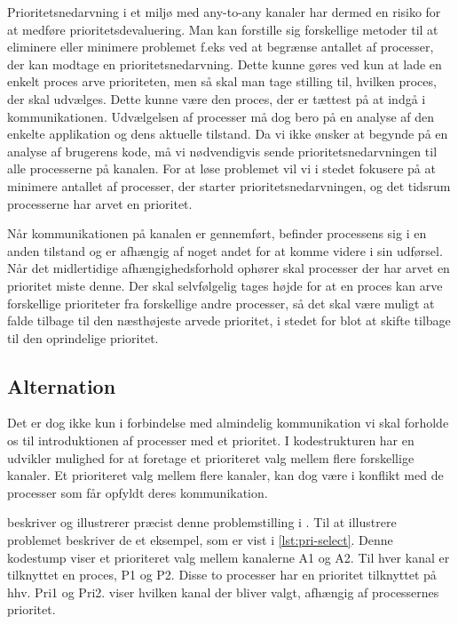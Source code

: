 Prioritetsnedarvning i et miljø med any-to-any kanaler har dermed en risiko for at medføre prioritetsdevaluering. Man kan forstille sig forskellige metoder til at eliminere eller minimere problemet f.eks ved at begrænse antallet af processer, der kan modtage en prioritetsnedarvning. Dette kunne gøres ved kun at lade en enkelt proces arve prioriteten,  men så skal man tage stilling til, hvilken proces, der skal udvælges. Dette kunne være den proces, der er tættest på at indgå i kommunikationen.  Udvælgelsen af processer må dog bero på en analyse af den enkelte applikation og dens aktuelle tilstand. Da vi ikke ønsker at begynde på en analyse af brugerens kode, må vi nødvendigvis sende prioritetsnedarvningen til alle processerne på kanalen. For at løse problemet vil vi i stedet fokusere på at minimere antallet af processer, der starter prioritetsnedarvningen, og det tidsrum processerne har arvet en prioritet.

Når kommunikationen på kanalen er gennemført, befinder processens sig i en anden tilstand og er afhængig af noget andet for at komme videre i sin udførsel. 
Når det midlertidige afhængighedsforhold ophører skal processer der har arvet en prioritet miste denne. Der skal selvfølgelig tages højde for at en proces kan arve forskellige prioriteter fra forskellige andre processer, så det skal være muligt at falde tilbage til den næsthøjeste arvede prioritet, i stedet for blot at skifte tilbage til den oprindelige prioritet. 

\subsection{Alternation}\label{misc:kanal-prioritet}
Det er dog ikke kun i forbindelse med almindelig kommunikation vi skal forholde os til introduktionen af processer med et prioritet. I kodestrukturen 
 har en udvikler mulighed for at foretage et  prioriteret valg mellem flere forskellige kanaler. Et prioriteret valg mellem flere kanaler, kan dog være i konflikt med de processer som får opfyldt deres kommunikation. 
  
\citeauthor{Burns1990} beskriver og illustrerer præcist denne problemstilling i \cite{Burns1990}. Til at illustrere problemet beskriver de et eksempel, som er vist i \cref{lst:pri-select}. Denne kodestump viser et prioriteret valg mellem kanalerne A1 og A2. Til hver kanal er tilknyttet en proces, P1 og P2. Disse to processer har en prioritet tilknyttet på hhv.  Pri1 og Pri2.  viser hvilken kanal der bliver valgt, afhængig af processernes prioritet.

